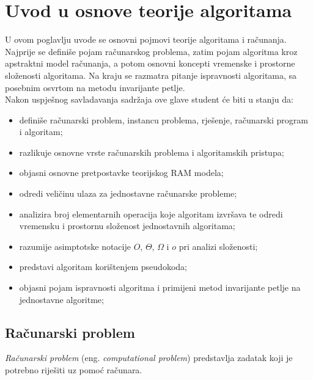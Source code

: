 \chapter{Uvod u osnove teorije algoritama}

U ovom poglavlju uvode se osnovni pojmovi teorije algoritama i računanja. Najprije se definiše pojam računarskog problema, zatim pojam algoritma kroz apstraktni model računanja, a potom osnovni koncepti vremenske i prostorne složenosti algoritama. Na kraju se razmatra pitanje ispravnosti algoritama, sa posebnim osvrtom na metodu invarijante petlje.\\


Nakon uspješnog savladavanja sadržaja ove glave student će biti u stanju da:

\begin{itemize}
	\item definiše računarski problem, instancu problema, rješenje, računarski program i algoritam;
	
	\item razlikuje osnovne vrste računarskih problema i algoritamskih pristupa;
	
	\item objasni osnovne pretpostavke teorijskog RAM modela;
	
	\item odredi veličinu ulaza za jednostavne računarske probleme;
	
	\item analizira broj elementarnih operacija koje algoritam izvršava te odredi vremensku i prostornu složenost jednostavnih algoritama;
	
	\item razumije asimptotske notacije $O$, $\Theta$, $\Omega$ i $o$	pri analizi složenosti;
	
	\item predstavi algoritam korištenjem pseudokoda;
	
	\item objasni pojam ispravnosti algoritma i primijeni metod	invarijante petlje na jednostavne algoritme;
	
 
\end{itemize}

\section{Računarski problem}

\textit{Računarski problem} (eng. \textit{computational problem}) predstavlja zadatak koji je potrebno riješiti uz pomoć računara.

